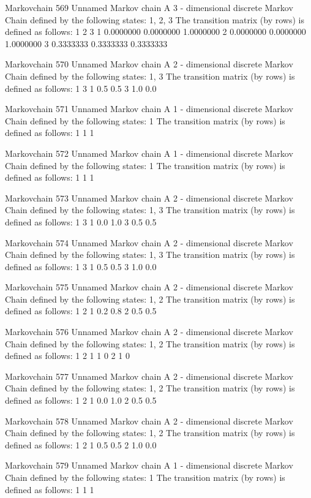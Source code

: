 \documentclass[
  nojss]{jss}
\begin{document}
\begin{CodeChunk}
\begin{CodeOutput}
Markovchain  569 
Unnamed Markov chain 
 A  3 - dimensional discrete Markov Chain defined by the following states: 
 1, 2, 3 
 The transition matrix  (by rows)  is defined as follows: 
          1         2         3
1 0.0000000 0.0000000 1.0000000
2 0.0000000 0.0000000 1.0000000
3 0.3333333 0.3333333 0.3333333

Markovchain  570 
Unnamed Markov chain 
 A  2 - dimensional discrete Markov Chain defined by the following states: 
 1, 3 
 The transition matrix  (by rows)  is defined as follows: 
    1   3
1 0.5 0.5
3 1.0 0.0

Markovchain  571 
Unnamed Markov chain 
 A  1 - dimensional discrete Markov Chain defined by the following states: 
 1 
 The transition matrix  (by rows)  is defined as follows: 
  1
1 1

Markovchain  572 
Unnamed Markov chain 
 A  1 - dimensional discrete Markov Chain defined by the following states: 
 1 
 The transition matrix  (by rows)  is defined as follows: 
  1
1 1

Markovchain  573 
Unnamed Markov chain 
 A  2 - dimensional discrete Markov Chain defined by the following states: 
 1, 3 
 The transition matrix  (by rows)  is defined as follows: 
    1   3
1 0.0 1.0
3 0.5 0.5

Markovchain  574 
Unnamed Markov chain 
 A  2 - dimensional discrete Markov Chain defined by the following states: 
 1, 3 
 The transition matrix  (by rows)  is defined as follows: 
    1   3
1 0.5 0.5
3 1.0 0.0

Markovchain  575 
Unnamed Markov chain 
 A  2 - dimensional discrete Markov Chain defined by the following states: 
 1, 2 
 The transition matrix  (by rows)  is defined as follows: 
    1   2
1 0.2 0.8
2 0.5 0.5

Markovchain  576 
Unnamed Markov chain 
 A  2 - dimensional discrete Markov Chain defined by the following states: 
 1, 2 
 The transition matrix  (by rows)  is defined as follows: 
  1 2
1 1 0
2 1 0

Markovchain  577 
Unnamed Markov chain 
 A  2 - dimensional discrete Markov Chain defined by the following states: 
 1, 2 
 The transition matrix  (by rows)  is defined as follows: 
    1   2
1 0.0 1.0
2 0.5 0.5

Markovchain  578 
Unnamed Markov chain 
 A  2 - dimensional discrete Markov Chain defined by the following states: 
 1, 2 
 The transition matrix  (by rows)  is defined as follows: 
    1   2
1 0.5 0.5
2 1.0 0.0

Markovchain  579 
Unnamed Markov chain 
 A  1 - dimensional discrete Markov Chain defined by the following states: 
 1 
 The transition matrix  (by rows)  is defined as follows: 
  1
1 1


\end{CodeOutput}
\end{CodeChunk}
\end{document}
